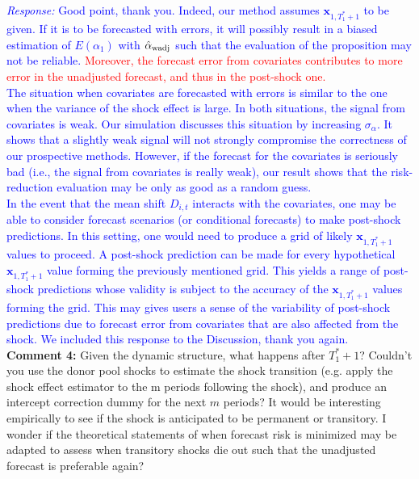 \documentclass[12pt]{article}
\newcommand{\response}[1]{\noindent \textcolor{blue}{\emph{Response:} #1}}
\begin{document}
\response{Good point, thank you. Indeed, our method assumes $\mathbf{x}_{1, T_1^* + 1}$ to be given. If it is to be forecasted with errors, it will possibly result in a biased estimation of $E(\alpha_1)$ with $\hat{\alpha}_{\rm wadj}$ such that the evaluation of the proposition may not be reliable. \textcolor{red}{Moreover, the forecast error from covariates contributes to more error in the unadjusted forecast, and thus in the post-shock one.}\\

The situation when covariates are forecasted with errors is similar to the one when the variance of the shock effect is large. In both situations, the signal from covariates is weak. Our simulation discusses this situation by increasing $\sigma_{\alpha}$. It shows that a slightly weak signal will not strongly compromise the correctness of our prospective methods. However, if the forecast for the covariates is seriously bad (i.e., the signal from covariates is really weak), our result shows that the risk-reduction evaluation may be only as good as a random guess. \\

In the event that the mean shift $D_{i,t}$ interacts with the covariates, one may be able to consider forecast scenarios (or conditional forecasts) \citep{baumeister2014real} to make post-shock predictions. In this setting, one would need to produce a grid of likely $\mathbf{x}_{1, T_1^* + 1}$ values to proceed. A post-shock prediction can be made for every hypothetical $\mathbf{x}_{1, T_1^* + 1}$ value forming the previously mentioned grid. This yields a range of post-shock predictions whose validity is subject to the accuracy of the $\mathbf{x}_{1, T_1^* + 1}$ values forming the grid. This may gives users a sense of the variability of post-shock predictions due to forecast error from covariates that are also affected from the shock. We included this response to the Discussion, thank you again.} \\

{\bf Comment 4:} Given the dynamic structure, what happens after $T_1^*+1$? Couldn't you use the donor pool shocks to estimate the shock transition (e.g. apply the shock effect estimator to the m periods following the shock), and produce an intercept correction dummy for the next $m$ periods? It would be interesting empirically to see if the shock is anticipated to be permanent or transitory. I wonder if the theoretical statements of when forecast risk is minimized may be adapted to assess when transitory shocks die out such that the unadjusted forecast is preferable again? \\
\end{document}
